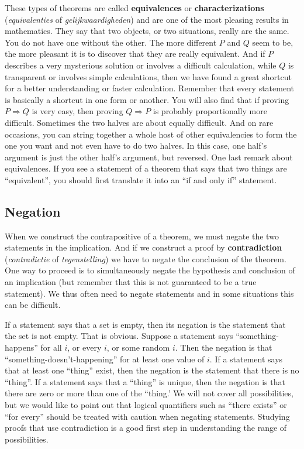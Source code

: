 These types of theorems are called \textbf{equivalences} or \textbf{characterizations} (\textit{equivalenties} of \textit{gelijkwaardigheden}) and are one of the most pleasing results in mathematics. They say that two objects, or two situations, really are the same. You do not have one without the other. The more different $P$ and $Q$ seem to be, the more pleasant it is to discover that they are really equivalent. And if $P$ describes a very mysterious solution or involves a difficult calculation, while $Q$ is transparent or involves simple calculations, then we have found a great shortcut for a better understanding or faster calculation. Remember that every statement is basically a shortcut in one form or another. You will also find that if proving $P\Rightarrow Q$ is very easy, then proving $Q\Rightarrow P$ is probably proportionally more difficult. Sometimes the two halves are about equally difficult. And on rare occasions, you can string together a whole host of other equivalencies to form the one you want and not even have to do two halves. In this case, one half's argument is just the other half's argument, but reversed.
%
One last remark about equivalences. If you see a statement of a theorem that says that two things are ``equivalent'', you should first translate it into an ``if and only if'' statement.


\subsection{Negation}
When we construct the contrapositive of a theorem, we must negate the two statements in the implication. And if we construct a proof by \textbf{contradiction} (\textit{contradictie} of \textit{tegenstelling}) we have to negate the conclusion of the theorem. One way to proceed is to simultaneously negate the hypothesis and conclusion of an implication (but remember that this is not guaranteed to be a true statement). We thus often need to negate statements and in some situations this can be difficult.

%
If a statement says that a set is empty, then its negation is the statement that the set is not empty. That is obvious. Suppose a statement says ``something-happens'' for all $i$, or every $i$, or some random $i$. Then the negation is that ``something-doesn't-happening'' for at least one value of $i$. If a statement says that at least one ``thing'' exist, then the negation is the statement that there is no ``thing''. If a statement says that a ``thing'' is unique, then the negation is that there are zero or more than one of the ``thing.'
%
We will not cover all possibilities, but we would like to point out that logical quantifiers such as ``there exists'' or ``for every'' should be treated with caution when negating statements. Studying proofs that use contradiction is a good first step in understanding the range of possibilities.

